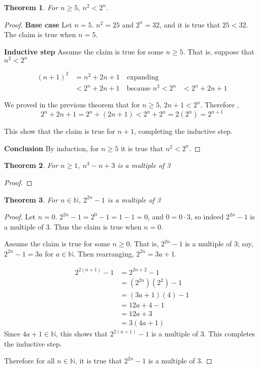 \documentclass[11pt]{article} %
\newtheorem{theorem}{Theorem}
\begin{document}
\newpage

\begin{theorem}
For $n \geq 5$, $n^2 < 2^n$.
\end{theorem}
\begin{proof}
\textbf{Base case} Let $n=5$. $n^2 = 25$ and $2^n=32$, and it is true that $25<32$. The claim is true when $n=5$.

\textbf{Inductive step} Assume the claim is true for some $n \geq 5$. That is, suppose that $n^2<2^n$

\begin{align*}
(n+1)^2&=n^2+2n+1 \quad \text{expanding}\\
&< 2^n + 2n+1 \quad \text{because } n^2<2^n
&< 2^n + 2n + 1
\end{align*}

We proved in the previous theorem that for $n \geq 5$, $2n+1 < 2^n$. Therefore
,
$$2^n+2n+1  = 2^n + (2n+1) <2^n + 2^n = 2(2^n)=2^{n+1}$$ 

This show that the claim is true for $n+1$, completing the inductive step.

\textbf{Conclusion} By induction, for $n \geq 5$ it is true that $n^2 < 2^n$.
\end{proof}

\begin{theorem}
For $n \geq 1$, $n^3-n+3$ is a multiple of 3
\end{theorem}
\begin{proof}

\end{proof}

\begin{theorem}
For $n \in \mathbb{N}$, $2^{2n}-1$ is a multiple of 3
\end{theorem}
\begin{proof}
Let $n=0$. $2^{2n}-1 = 2^0 - 1 = 1-1=0$, and $0 = 0 \cdot 3$, so indeed $2^{2n}-1$ is a multiple of 3. Thus the claim is true when $n=0$.

Assume the claim is true for some $n \geq 0$. That is, $2^{2n}-1$ is a multiple of 3; say, $2^{2n}-1 = 3a$ for $a \in \mathbb{N}$. Then
rearranging, $2^{2n} = 3a+1$.

\begin{align*}
2^{2(n+1)} - 1&=2^{2n+2} - 1\\
&=(2^{2n}) (2^2) - 1\\
&=(3a+1)(4) - 1\\
&=12a+4-1\\
&=12a+3\\
&=3(4a+1)
\end{align*}
Since $4a +1 \in \mathbb{N}$, this shows that $2^{2(n+1)}-1$ is a multiple of 3. This completes the inductive step.

Therefore for all $n \in \mathbb{N}$, it is true that $2^{2n}-1$ is a multiple of 3.
\end{proof}
  
\end{document}

